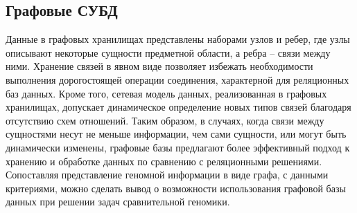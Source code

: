 \subsection{Графовые СУБД}
Данные в графовых хранилищах представлены наборами узлов и ребер, где узлы описывают некоторые сущности предметной области, а ребра – связи между ними. Хранение связей в явном виде позволяет избежать необходимости выполнения дорогостоящей операции соединения, характерной для реляционных баз данных. Кроме того, сетевая модель данных, реализованная в графовых хранилищах, допускает динамическое определение новых типов связей благодаря отсутствию схем отношений. Таким образом, в случаях, когда связи между сущностями несут не меньше информации, чем сами сущности, или могут быть динамически изменены, графовые базы предлагают более эффективный\cite{20_batra2012comparative,21_medhi2017relational} подход к хранению и обработке данных по сравнению с реляционными решениями. Сопоставляя представление геномной информации в виде графа, с данными критериями, можно сделать вывод о возможности использования графовой базы данных при решении задач сравнительной геномики\cite{22_miller2013graph}.

\pagebreak